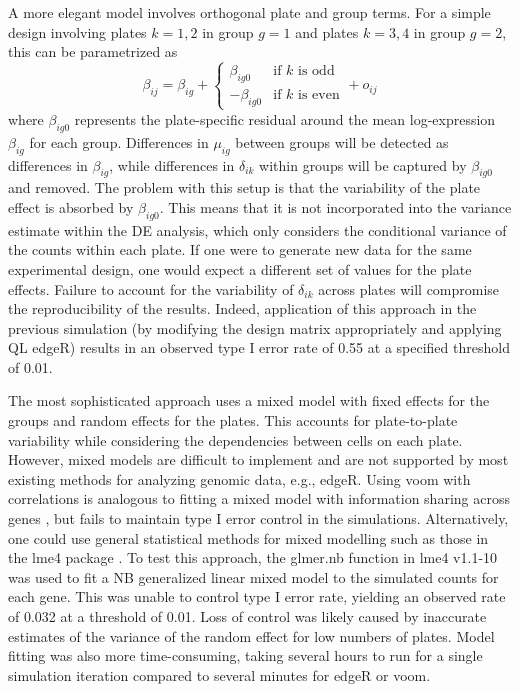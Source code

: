 \documentclass[oupdraft]{bio}
\begin{document}
A more elegant model involves orthogonal plate and group terms.
For a simple design involving plates $k=1,2$ in group $g=1$ and plates $k=3,4$ in group $g=2$, this can be parametrized as
\[
    \beta_{ij} = \beta_{ig} + 
    \begin{cases} 
        \beta_{ig0} & \mbox{if $k$ is odd} \\
        - \beta_{ig0} & \mbox{if $k$ is even}
    \end{cases}
    + o_{ij}
\]
where $\beta_{ig0}$ represents the plate-specific residual around the mean log-expression $\beta_{ig}$ for each group.
Differences in $\mu_{ig}$ between groups will be detected as differences in $\beta_{ig}$, 
    while differences in $\delta_{ik}$ within groups will be captured by $\beta_{ig0}$ and removed.
The problem with this setup is that the variability of the plate effect is absorbed by $\beta_{ig0}$.
This means that it is not incorporated into the variance estimate within the DE analysis, which only considers the conditional variance of the counts within each plate.
If one were to generate new data for the same experimental design, one would expect a different set of values for the plate effects.
Failure to account for the variability of $\delta_{ik}$ across plates will compromise the reproducibility of the results.
Indeed, application of this approach in the previous simulation (by modifying the design matrix appropriately and applying QL edgeR)
    results in an observed type I error rate of 0.55 at a specified threshold of 0.01.

The most sophisticated approach uses a mixed model with fixed effects for the groups and random effects for the plates.
This accounts for plate-to-plate variability while considering the dependencies between cells on each plate.
However, mixed models are difficult to implement and are not supported by most existing methods for analyzing genomic data, e.g., edgeR.
Using voom with correlations is analogous to fitting a mixed model with information sharing across genes \citep{smyth2005limma}, 
    but fails to maintain type I error control in the simulations.
Alternatively, one could use general statistical methods for mixed modelling such as those in the lme4 package \citep{bates2015fitting}.
To test this approach, the glmer.nb function in lme4 v1.1-10 was used to fit a NB generalized linear mixed model to the simulated counts for each gene.
This was unable to control type I error rate, yielding an observed rate of 0.032 at a threshold of 0.01.
Loss of control was likely caused by inaccurate estimates of the variance of the random effect for low numbers of plates.
Model fitting was also more time-consuming, taking several hours to run for a single simulation iteration compared to several minutes for edgeR or voom.
\end{document}
